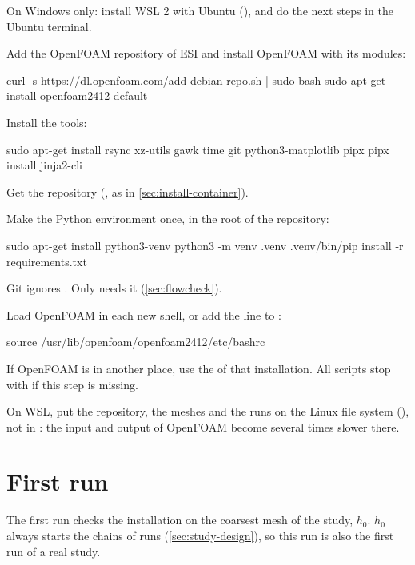 \begin{steps}
\item On Windows only: install WSL 2 with Ubuntu (), and
  do the next steps in the Ubuntu terminal.
\item Add the OpenFOAM repository of ESI and install OpenFOAM with its modules:
\begin{shell}
curl -s https://dl.openfoam.com/add-debian-repo.sh | sudo bash
sudo apt-get install openfoam2412-default
\end{shell}
\item Install the tools:
\begin{shell}
sudo apt-get install rsync xz-utils gawk time git python3-matplotlib pipx
pipx install jinja2-cli
\end{shell}
\item Get the repository (, as in \cref{sec:install-container}).
\item Make the Python environment once, in the root of the repository:
\begin{shell}
sudo apt-get install python3-venv
python3 -m venv .venv
.venv/bin/pip install -r requirements.txt
\end{shell}
  Git ignores . Only  needs it (\cref{sec:flowcheck}).
\item Load OpenFOAM in each new shell, or add the line to :
\begin{shell}
source /usr/lib/openfoam/openfoam2412/etc/bashrc
\end{shell}
  If OpenFOAM is in another place, use the  of that installation.
  All scripts stop with  if this step is
  missing.
\end{steps}

\begin{caution}
On WSL, put the repository, the meshes and the runs on the Linux file system
(), not in : the input and output of OpenFOAM become several
times slower there.
\end{caution}

\section{First run}\label{sec:first-run}

The first run checks the installation on the coarsest mesh of the study, $h_0$. $h_0$
always starts the chains of runs (\cref{sec:study-design}), so this run is also the
first run of a real study.

